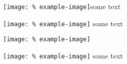\texttt{[image: \%
	example-image]}some text

\texttt{[image: \%
	example-image]} some text

\texttt{[image: \%
	example-image]} %

\texttt{[image: \%
	example-image]}  some text
